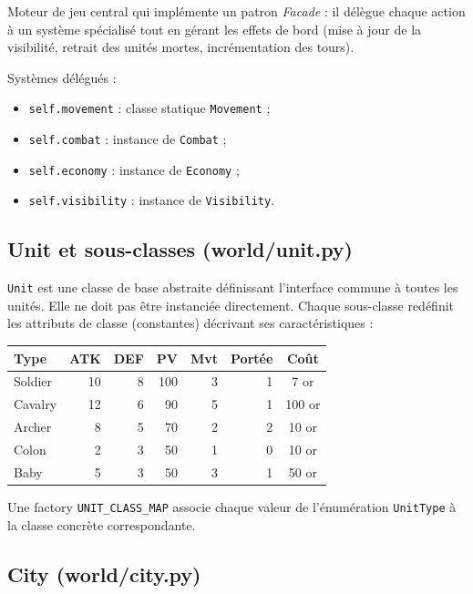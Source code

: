 \documentclass[12pt, a4paper]{article}
\begin{document}
Moteur de jeu central qui implémente un patron \textit{Facade} : il délègue chaque action à
un système spécialisé tout en gérant les effets de bord (mise à jour de la visibilité, retrait
des unités mortes, incrémentation des tours).

Systèmes délégués :
\begin{itemize}
    \item \texttt{self.movement} : classe statique \texttt{Movement} ;
    \item \texttt{self.combat} : instance de \texttt{Combat} ;
    \item \texttt{self.economy} : instance de \texttt{Economy} ;
    \item \texttt{self.visibility} : instance de \texttt{Visibility}.
\end{itemize}

\subsection{Unit et sous-classes (world/unit.py)}

\texttt{Unit} est une classe de base abstraite définissant l'interface commune à toutes les
unités. Elle ne doit pas être instanciée directement. Chaque sous-classe redéfinit les
attributs de classe (constantes) décrivant ses caractéristiques :

\begin{center}
\begin{tabular}{lrrrrrc}
\toprule
\textbf{Type} & \textbf{ATK} & \textbf{DEF} & \textbf{PV} & \textbf{Mvt} & \textbf{Portée} & \textbf{Coût} \\
\midrule
Soldier  & 10 & 8 & 100 & 3 & 1 & 7 or \\
Cavalry  & 12   & 6 & 90  & 5 & 1 & 100 or \\
Archer   & 8    & 5 & 70  & 2 & 2 & 10 or \\
Colon    & 2    & 3 & 50  & 1 & 0 & 10 or \\
Baby     & 5    & 3 & 50  & 3 & 1 & 50 or \\
\bottomrule
\end{tabular}
\end{center}

Une factory \texttt{UNIT\_CLASS\_MAP} associe chaque valeur de l'énumération \texttt{UnitType}
à la classe concrète correspondante.

\subsection{City (world/city.py)}
\end{document}
